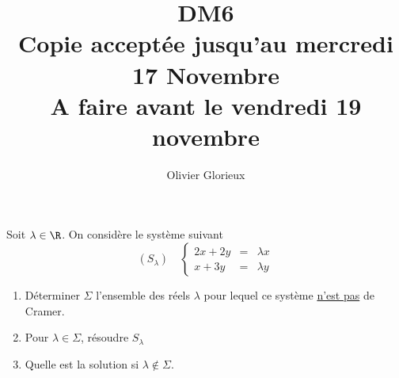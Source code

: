 \documentclass[a4paper, 11pt,reqno]{article}
\author{Olivier Glorieux}
\begin{document}
\title{DM6 \\
\small{Copie acceptée jusqu'au mercredi 17 Novembre} \\
A faire avant le vendredi 19 novembre
}






\begin{exercice}
Soit $\lambda \in \R$. On considère le système suivant 
$$(S_\lambda)\quad  \left\{ \begin{array}{ccc}
2x +2y & =& \lambda x\\
x +3y  & =& \lambda y 
\end{array}\right. $$

\begin{enumerate}
\item Déterminer $\Sigma$ l'ensemble des réels $\lambda$ pour lequel ce système \underline{n'est pas} de Cramer. 
\item Pour $\lambda \in \Sigma$, résoudre $S_\lambda$
\item Quelle est la solution si $\lambda \notin \Sigma$. 
\end{enumerate}
\end{exercice}
\end{document}
